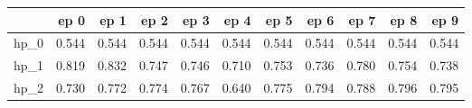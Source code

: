 \begin{tabular}{lrrrrrrrrrr}
\toprule
{} &   ep 0 &   ep 1 &   ep 2 &   ep 3 &   ep 4 &   ep 5 &   ep 6 &   ep 7 &   ep 8 &   ep 9 \\
\midrule
hp\_0 &  0.544 &  0.544 &  0.544 &  0.544 &  0.544 &  0.544 &  0.544 &  0.544 &  0.544 &  0.544 \\
hp\_1 &  0.819 &  0.832 &  0.747 &  0.746 &  0.710 &  0.753 &  0.736 &  0.780 &  0.754 &  0.738 \\
hp\_2 &  0.730 &  0.772 &  0.774 &  0.767 &  0.640 &  0.775 &  0.794 &  0.788 &  0.796 &  0.795 \\
\bottomrule
\end{tabular}
